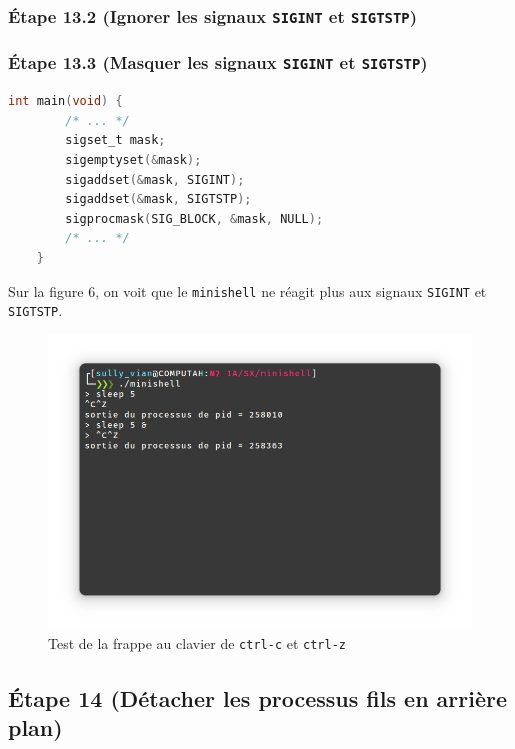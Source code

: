 \documentclass{article}
\begin{document}
\subsubsection*{Étape 13.2 (Ignorer les signaux \texttt{SIGINT} et \texttt{SIGTSTP})}

\subsubsection*{Étape 13.3 (Masquer les signaux \texttt{SIGINT} et \texttt{SIGTSTP})}

\begin{lstlisting}[language=C, caption=ajout de la question 13.3]
    int main(void) {
        /* ... */
        sigset_t mask;
        sigemptyset(&mask);
        sigaddset(&mask, SIGINT);
        sigaddset(&mask, SIGTSTP);
        sigprocmask(SIG_BLOCK, &mask, NULL);
        /* ... */
    }
\end{lstlisting}

Sur la figure 6, on voit que le \texttt{minishell} ne réagit plus aux signaux \texttt{SIGINT} et \texttt{SIGTSTP}.

\begin{figure}[H]
    \centering
    \includegraphics[width=\textwidth]{./resources/E13.3.png}
    \caption{Test de la frappe au clavier de \texttt{ctrl-c} et \texttt{ctrl-z}}
    \label{fig:E13.3}
\end{figure}

\subsection*{Étape 14 (Détacher les processus fils en arrière plan)}
\end{document}
